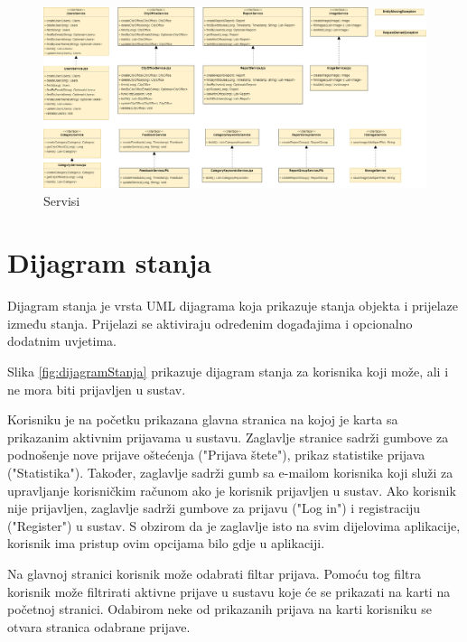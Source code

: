 			\begin{figure}[H]
				\includegraphics[width=\textwidth]{slike/service.png} %
				\caption{Servisi}
				\label{fig:service} %
			\end{figure}
			
			\eject
			
			
			\section{Dijagram stanja}
			
			Dijagram stanja je vrsta UML dijagrama koja prikazuje stanja objekta i prijelaze između stanja. Prijelazi se aktiviraju određenim događajima i opcionalno dodatnim uvjetima. 
			
			Slika \ref{fig:dijagramStanja} prikazuje dijagram stanja za korisnika koji može, ali i ne mora biti prijavljen u sustav. 
			
			Korisniku je na početku prikazana glavna stranica na kojoj je karta sa prikazanim aktivnim prijavama u sustavu. Zaglavlje stranice sadrži gumbove za podnošenje nove prijave oštećenja ("Prijava štete"), prikaz statistike prijava ("Statistika"). Također, zaglavlje sadrži gumb sa e-mailom korisnika koji služi za upravljanje korisničkim računom ako je korisnik prijavljen u sustav. Ako korisnik nije prijavljen, zaglavlje sadrži gumbove za prijavu ("Log in") i registraciju ("Register") u  sustav. S obzirom da je zaglavlje isto na svim dijelovima aplikacije, korisnik ima pristup ovim opcijama bilo gdje u aplikaciji.
			
			Na glavnoj stranici korisnik može odabrati filtar prijava. Pomoću tog filtra korisnik može filtrirati aktivne prijave u sustavu koje će se prikazati na karti na početnoj stranici. Odabirom neke od prikazanih prijava na karti korisniku se otvara stranica odabrane prijave.
			
